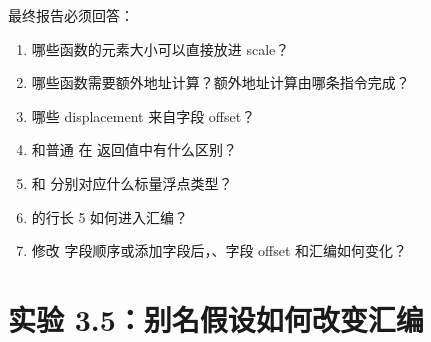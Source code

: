 \begin{labbox}
最终报告必须回答：

\begin{enumerate}
  \item 哪些函数的元素大小可以直接放进 scale？
  \item 哪些函数需要额外地址计算？额外地址计算由哪条指令完成？
  \item 哪些 displacement 来自字段 offset？
  \item {} 和普通  在  返回值中有什么区别？
  \item {} 和  分别对应什么标量浮点类型？
  \item {} 的行长 5 如何进入汇编？
  \item 修改  字段顺序或添加字段后，、字段 offset 和汇编如何变化？
\end{enumerate}
\end{labbox}

\section{实验 3.5：别名假设如何改变汇编}


